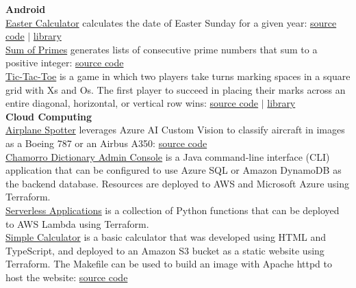 \documentclass[10pt]{res} %
\begin{document}
\begin{resume}
{\bf Android} \\
 \href{https://play.google.com/store/apps/details?id=com.bjdelacruz.easter}{\color{blue}Easter Calculator} calculates the date of Easter Sunday for a given year: \href{https://bitbucket.org/bjpeterdelacruz/easter-calculator/src/api-version-34}{\color{blue}source code} $|$ \href{https://bitbucket.org/bjpeterdelacruz/easter-calculator-library}{\color{blue}library} \\
 \href{https://play.google.com/store/apps/details?id=com.bpd.primes}{\color{blue}Sum of Primes} generates lists of consecutive prime numbers that sum to a positive integer: \href{https://bitbucket.org/bjpeterdelacruz/sum-of-primes}{\color{blue}source code} \\
 \href{https://play.google.com/store/apps/details?id=com.bpd.tictactoe}{\color{blue}Tic-Tac-Toe} is a game in which two players take turns marking spaces in a square grid with Xs and Os. The first player to succeed in placing their marks across an entire diagonal, horizontal, or vertical row wins: \href{https://bitbucket.org/bjpeterdelacruz/tic-tac-toe}{\color{blue}source code} $|$ \href{https://bitbucket.org/bjpeterdelacruz/tic-tac-toe-library}{\color{blue}library} \\
{\bf Cloud Computing} \\
 \href{https://airplane-spotter-knartlettq-ul.a.run.app}{\color{blue}Airplane Spotter} leverages Azure AI Custom Vision to classify aircraft in images as a Boeing 787 or an Airbus A350: \href{https://bitbucket.org/bjpeterdelacruz/airplane-spotter}{\color{blue}source code} \\
 \href{https://bitbucket.org/bjpeterdelacruz/chamorro-dictionary-admin-console}{\color{blue}Chamorro Dictionary Admin Console} is a Java command-line interface (CLI) application that can be configured to use Azure SQL or Amazon DynamoDB as the backend database. Resources are deployed to AWS and Microsoft Azure using Terraform. \\
 \href{https://bitbucket.org/bjpeterdelacruz/serverless-applications}{\color{blue}Serverless Applications} is a collection of Python functions that can be deployed to AWS Lambda using Terraform. \\
 \href{https://drlg87syexil1.cloudfront.net}{\color{blue}Simple Calculator} is a basic calculator that was developed using HTML and TypeScript, and deployed to an Amazon S3 bucket as a static website using Terraform. The Makefile can be used to build an image with Apache httpd to host the website: \href{https://bitbucket.org/bjpeterdelacruz/simple-calculator}{\color{blue}source code} \\

\end{resume}
\end{document}
